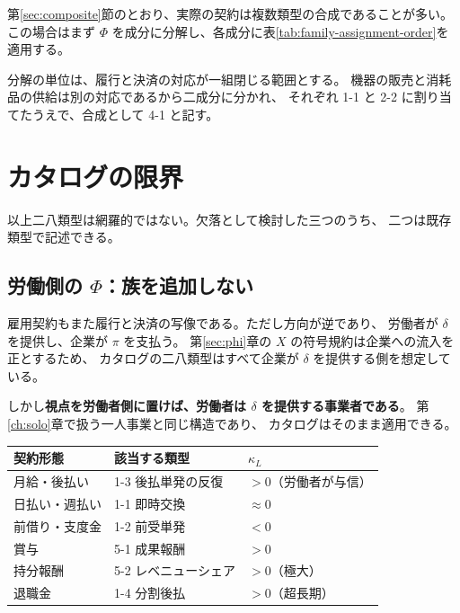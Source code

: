 \begin{remark}[複合契約の扱い]
\label{rem:composite-assignment}
第\ref{sec:composite}節のとおり、実際の契約は複数類型の合成であることが多い。
この場合はまず $\Phi$ を成分に分解し、各成分に表\ref{tab:family-assignment-order}を適用する。

分解の単位は、履行と決済の対応が一組閉じる範囲とする。
機器の販売と消耗品の供給は別の対応であるから二成分に分かれ、
それぞれ 1-1 と 2-2 に割り当てたうえで、合成として 4-1 と記す。
\end{remark}

\section{カタログの限界}

以上二八類型は網羅的ではない。欠落として検討した三つのうち、
二つは既存類型で記述できる。

\subsection{労働側の \texorpdfstring{$\Phi$}{Phi}：族を追加しない}
\label{sec:labor-phi}

雇用契約もまた履行と決済の写像である。ただし方向が逆であり、
労働者が $\delta$ を提供し、企業が $\pi$ を支払う。
第\ref{sec:phi}章の $X$ の符号規約は企業への流入を正とするため、
カタログの二八類型はすべて企業が $\delta$ を提供する側を想定している。

しかし\textbf{視点を労働者側に置けば、労働者は $\delta$ を提供する事業者である}。
第\ref{ch:solo}章で扱う一人事業と同じ構造であり、
カタログはそのまま適用できる。

\begin{center}
\begin{tabularx}{\textwidth}{@{}lXl@{}}
\toprule
契約形態 & 該当する類型 & $\kappa_L$ \\
\midrule
月給・後払い & 1-3 後払単発の反復 & $>0$（労働者が与信） \\
日払い・週払い & 1-1 即時交換 & $\approx 0$ \\
前借り・支度金 & 1-2 前受単発 & $<0$ \\
賞与 & 5-1 成果報酬 & $>0$ \\
持分報酬 & 5-2 レベニューシェア & $>0$（極大） \\
退職金 & 1-4 分割後払 & $>0$（超長期） \\
\bottomrule
\end{tabularx}
\label{tab:labor-phi-mapping}
\end{center}


